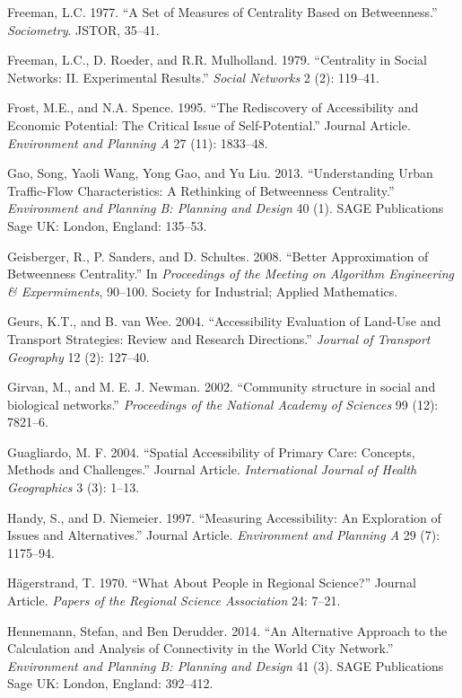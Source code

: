 \documentclass[]{elsarticle} %
\begin{document}
\hypertarget{ref-Freeman1977}{}
Freeman, L.C. 1977. ``A Set of Measures of Centrality Based on
Betweenness.'' \emph{Sociometry}. JSTOR, 35--41.

\hypertarget{ref-Freeman1979}{}
Freeman, L.C., D. Roeder, and R.R. Mulholland. 1979. ``Centrality in
Social Networks: II. Experimental Results.'' \emph{Social Networks} 2
(2): 119--41.

\hypertarget{ref-Frost1995}{}
Frost, M.E., and N.A. Spence. 1995. ``The Rediscovery of Accessibility
and Economic Potential: The Critical Issue of Self-Potential.'' Journal
Article. \emph{Environment and Planning A} 27 (11): 1833--48.

\hypertarget{ref-gao2013understanding}{}
Gao, Song, Yaoli Wang, Yong Gao, and Yu Liu. 2013. ``Understanding Urban
Traffic-Flow Characteristics: A Rethinking of Betweenness Centrality.''
\emph{Environment and Planning B: Planning and Design} 40 (1). SAGE
Publications Sage UK: London, England: 135--53.

\hypertarget{ref-Geisberger2008}{}
Geisberger, R., P. Sanders, and D. Schultes. 2008. ``Better
Approximation of Betweenness Centrality.'' In \emph{Proceedings of the
Meeting on Algorithm Engineering \& Expermiments}, 90--100. Society for
Industrial; Applied Mathematics.

\hypertarget{ref-Geurs2004}{}
Geurs, K.T., and B. van Wee. 2004. ``Accessibility Evaluation of
Land-Use and Transport Strategies: Review and Research Directions.''
\emph{Journal of Transport Geography} 12 (2): 127--40.

\hypertarget{ref-Girvan2002community}{}
Girvan, M., and M. E. J. Newman. 2002. ``Community structure in social
and biological networks.'' \emph{Proceedings of the National Academy of
Sciences} 99 (12): 7821--6.

\hypertarget{ref-Guagliardo2004}{}
Guagliardo, M. F. 2004. ``Spatial Accessibility of Primary Care:
Concepts, Methods and Challenges.'' Journal Article. \emph{International
Journal of Health Geographics} 3 (3): 1--13.

\hypertarget{ref-Handy1997}{}
Handy, S., and D. Niemeier. 1997. ``Measuring Accessibility: An
Exploration of Issues and Alternatives.'' Journal Article.
\emph{Environment and Planning A} 29 (7): 1175--94.

\hypertarget{ref-Hagerstrand1970people}{}
Hägerstrand, T. 1970. ``What About People in Regional Science?'' Journal
Article. \emph{Papers of the Regional Science Association} 24: 7--21.

\hypertarget{ref-hennemann2014alternative}{}
Hennemann, Stefan, and Ben Derudder. 2014. ``An Alternative Approach to
the Calculation and Analysis of Connectivity in the World City
Network.'' \emph{Environment and Planning B: Planning and Design} 41
(3). SAGE Publications Sage UK: London, England: 392--412.
\end{document}
